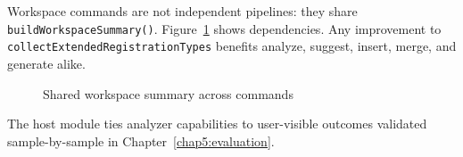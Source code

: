 Workspace commands are not independent pipelines: they share \texttt{buildWorkspaceSummary()}. Figure~\ref{fig:command-deps} shows dependencies. Any improvement to \texttt{collectExtendedRegistrationTypes} benefits analyze, suggest, insert, merge, and generate alike.

\begin{figure}[htbp]
\centering
{}
\caption{Shared workspace summary across commands}
\label{fig:command-deps}
\end{figure}

The host module ties analyzer capabilities to user-visible outcomes validated sample-by-sample in Chapter~\ref{chap5:evaluation}.
